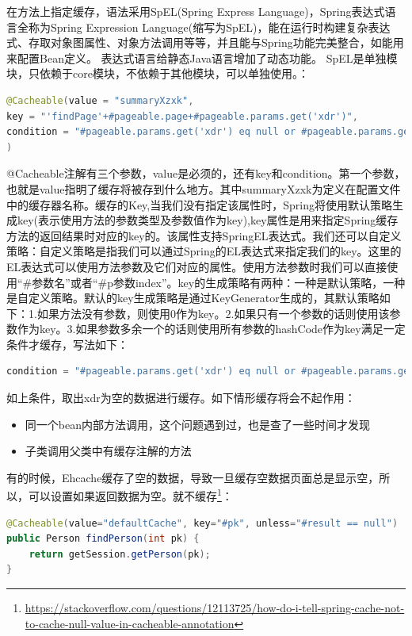 \documentclass[12pt]{book}
\numberwithin{dummy}{section}
\theoremstyle{ocrenumbox}
\theoremstyle{blacknumex}
\theoremstyle{blacknumbox}
\theoremstyle{ocrenum}
\begin{document}
在方法上指定缓存，语法采用SpEL(Spring Express Language)，Spring表达式语言全称为Spring Expression Language(缩写为SpEL)，能在运行时构建复杂表达式、存取对象图属性、对象方法调用等等，并且能与Spring功能完美整合，如能用来配置Bean定义。 表达式语言给静态Java语言增加了动态功能。
SpEL是单独模块，只依赖于core模块，不依赖于其他模块，可以单独使用。：

\begin{lstlisting}[language=Java]
@Cacheable(value = "summaryXzxk",
key = "'findPage'+#pageable.page+#pageable.params.get('xdr')",
condition = "#pageable.params.get('xdr') eq null or #pageable.params.get('xdr') eq ''"
)
\end{lstlisting}

@Cacheable注解有三个参数，value是必须的，还有key和condition。第一个参数，也就是value指明了缓存将被存到什么地方。其中summaryXzxk为定义在配置文件中的缓存器名称。缓存的Key,当我们没有指定该属性时，Spring将使用默认策略生成key(表示使用方法的参数类型及参数值作为key),key属性是用来指定Spring缓存方法的返回结果时对应的key的。该属性支持SpringEL表达式。我们还可以自定义策略：自定义策略是指我们可以通过Spring的EL表达式来指定我们的key。这里的EL表达式可以使用方法参数及它们对应的属性。使用方法参数时我们可以直接使用“\#参数名”或者“\#p参数index”。key的生成策略有两种：一种是默认策略，一种是自定义策略。默认的key生成策略是通过KeyGenerator生成的，其默认策略如下：1.如果方法没有参数，则使用0作为key。2.如果只有一个参数的话则使用该参数作为key。3.如果参数多余一个的话则使用所有参数的hashCode作为key满足一定条件才缓存，写法如下：

\begin{lstlisting}[language=Java]
condition = "#pageable.params.get('xdr') eq null or #pageable.params.get('xdr') eq ''"
\end{lstlisting}

如上条件，取出xdr为空的数据进行缓存。如下情形缓存将会不起作用：

\begin{itemize}
	\item{同一个bean内部方法调用，这个问题遇到过，也是查了一些时间才发现}
	\item{子类调用父类中有缓存注解的方法}
\end{itemize}

有的时候，Ehcache缓存了空的数据，导致一旦缓存空数据页面总是显示空，所以，可以设置如果返回数据为空。就不缓存\footnote{\url{https://stackoverflow.com/questions/12113725/how-do-i-tell-spring-cache-not-to-cache-null-value-in-cacheable-annotation}}：


\begin{lstlisting}[language=Java]
@Cacheable(value="defaultCache", key="#pk", unless="#result == null")
public Person findPerson(int pk) {
	return getSession.getPerson(pk);
}
\end{lstlisting}
\end{document}
